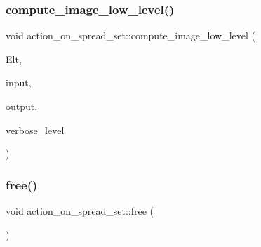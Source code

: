 \subsubsection{\texorpdfstring{compute\+\_\+image\+\_\+low\+\_\+level()}{compute\_image\_low\_level()}}
{\footnotesize\ttfamily void action\+\_\+on\+\_\+spread\+\_\+set\+::compute\+\_\+image\+\_\+low\+\_\+level (\begin{DoxyParamCaption}\item[{\mbox{\hyperlink{galois_8h_a09fddde158a3a20bd2dcadb609de11dc}{I\+NT}} $\ast$}]{Elt,  }\item[{\mbox{\hyperlink{galois_8h_a09fddde158a3a20bd2dcadb609de11dc}{I\+NT}} $\ast$}]{input,  }\item[{\mbox{\hyperlink{galois_8h_a09fddde158a3a20bd2dcadb609de11dc}{I\+NT}} $\ast$}]{output,  }\item[{\mbox{\hyperlink{galois_8h_a09fddde158a3a20bd2dcadb609de11dc}{I\+NT}}}]{verbose\+\_\+level }\end{DoxyParamCaption})}

\mbox{\label{classaction__on__spread__set_a57fa3a018254a9a4024ec69ff313ee4e}} 
\subsubsection{\texorpdfstring{free()}{free()}}
{\footnotesize\ttfamily void action\+\_\+on\+\_\+spread\+\_\+set\+::free (\begin{DoxyParamCaption}{ }\end{DoxyParamCaption})}

\mbox{\label{classaction__on__spread__set_a9319d36cd7e051dd55d8a1fe07df6485}} 
